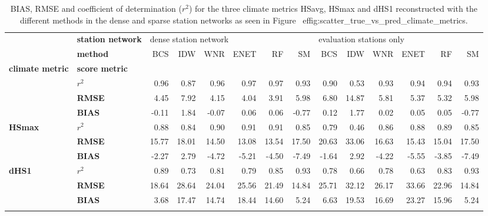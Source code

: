 \begin{table}[t]
\centering
\caption{BIAS, RMSE and coefficient of determination ($r^2$) for the three climate metrics HSavg, HSmax and dHS1 reconstructed with the different methods in the dense and sparse station networks as seen in Figure~
ef{fig:scatter_true_vs_pred_climate_metrics}.}
\label{tab:climate_metrics_scores_table}
\begin{tabular}{llrrrrrrrrrrrr}
\tophline
     & \textbf{station network} & \multicolumn{6}{l}{dense station network} & \multicolumn{6}{l}{evaluation stations only} \\
     & \textbf{method} &                   BCS &   IDW &   WNR &  ENET &    RF &    SM &                      BCS &   IDW &   WNR &  ENET &    RF &    SM \\
\textbf{climate metric} & \textbf{score metric} &                       &       &       &       &       &       &                          &       &       &       &       &       \\
\middlehline
\multirow{3}{*}{\textbf{HSavg}} & \textbf{$r^{2}$} &                  0.96 &  0.87 &  0.96 &  0.97 &  0.97 &  0.93 &                     0.90 &  0.53 &  0.93 &  0.94 &  0.94 &  0.93 \\
     & \textbf{RMSE} &                  4.45 &  7.92 &  4.15 &  4.04 &  3.91 &  5.98 &                     6.80 & 14.87 &  5.81 &  5.37 &  5.32 &  5.98 \\
     & \textbf{BIAS} &                 -0.11 &  1.84 & -0.07 &  0.06 &  0.06 & -0.77 &                     0.12 &  1.77 &  0.02 &  0.05 &  0.05 & -0.77 \\
\cline{1-14}
\multirow{3}{*}{\textbf{HSmax}} & \textbf{$r^{2}$} &                  0.88 &  0.84 &  0.90 &  0.91 &  0.91 &  0.85 &                     0.79 &  0.46 &  0.86 &  0.88 &  0.89 &  0.85 \\
     & \textbf{RMSE} &                 15.77 & 18.01 & 14.50 & 13.08 & 13.54 & 17.50 &                    20.63 & 33.06 & 16.63 & 15.43 & 15.04 & 17.50 \\
     & \textbf{BIAS} &                 -2.27 &  2.79 & -4.72 & -5.21 & -4.50 & -7.49 &                    -1.64 &  2.92 & -4.22 & -5.55 & -3.85 & -7.49 \\
\cline{1-14}
\multirow{3}{*}{\textbf{dHS1}} & \textbf{$r^{2}$} &                  0.89 &  0.73 &  0.81 &  0.79 &  0.85 &  0.93 &                     0.78 &  0.66 &  0.78 &  0.63 &  0.83 &  0.93 \\
     & \textbf{RMSE} &                 18.64 & 28.64 & 24.04 & 25.56 & 21.49 & 14.84 &                    25.71 & 32.12 & 26.17 & 33.66 & 22.96 & 14.84 \\
     & \textbf{BIAS} &                  3.68 & 17.47 & 14.74 & 18.44 & 14.60 &  5.24 &                     6.63 & 19.53 & 16.69 & 23.27 & 15.96 &  5.24 \\
\bottomhline
\end{tabular}
\end{table}
